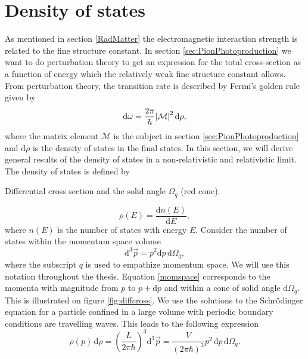 \section{Density of states}
As mentioned in section \ref{RadMatter} the electromagnetic interaction strength is related to the fine structure constant. In section \ref{sec:PionPhotoproduction} we want to do perturbation theory to get an expression for the total cross-section as a function of energy which the relatively weak fine structure constant allows. From perturbation theory, the transition rate is described by Fermi's golden rule given by
\begin{equation} \label{FermiGolden}
	\text{d}\omega = \frac{2\pi}{\hbar}\abs{\mathcal{M}}^2 \text{d}\rho,
\end{equation}
where the matrix element $\mathcal{M}$ is the subject in section \ref{sec:PionPhotoproduction} and $\text{d}\rho$ is the density of states in the final states. In this section, we will derive general results of the density of states in a non-relativistic and relativistic limit. The density of states is defined by
\begin{marginfigure}
	\centering
	
	\caption{Differential cross section and the solid angle $\Omega_q$ (red cone).}
	\label{fig:diffcross}
\end{marginfigure}
\begin{equation} \label{DensityOfStates}
	\rho(E) = \frac{\text{d}n(E)}{\text{d}E},
\end{equation}
where $n(E)$ is the number of states with energy $E$. Consider the number of states within the momentum space volume
\begin{equation} \label{momspace}
	\text{d}^3\vec{p} = p^2 \text{d}p \, \text{d}\Omega_q,
\end{equation}
where the subscript $q$ is used to empathize momentum space. We will use this notation throughout the thesis. Equation \eqref{momspace} corresponds to the momenta with magnitude from $p$ to $p+\text{d}p$ and within a cone of solid angle $\text{d}\Omega_q$. This is illustrated on figure \ref{fig:diffcross}. We use the solutions to the Schrödinger equation for a particle confined in a large volume with periodic boundary conditions are travelling waves. This leads to the following expression
\begin{equation} \label{densityrho}
	\rho(p) \, \text{d}\rho = \left( \frac{L}{2\pi\hbar}\right)^3 \text{d}^3 \vec{p} = \frac{V}{(2\pi\hbar)^3} p^2 \, \text{d}p \, \text{d}\Omega_q.
\end{equation}
